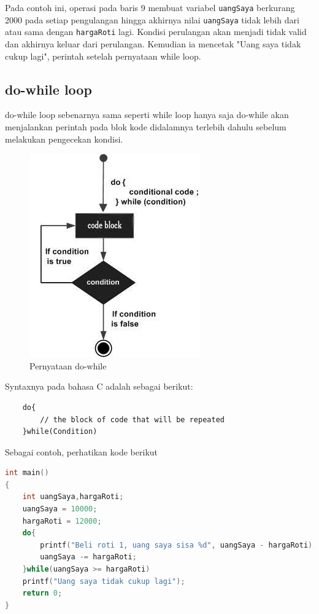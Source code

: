 Pada contoh ini, operasi pada baris 9 membuat variabel \verb|uangSaya| berkurang 2000 pada setiap pengulangan hingga akhirnya nilai \verb|uangSaya| tidak lebih dari atau sama dengan \verb|hargaRoti| lagi.
Kondisi perulangan akan menjadi tidak valid dan akhirnya keluar dari perulangan. Kemudian ia mencetak "Uang saya tidak cukup lagi", perintah setelah pernyataan while loop.
\subsection{do-while loop}
do-while loop sebenarnya sama seperti while loop hanya saja do-while akan menjalankan perintah pada blok kode didalamnya terlebih dahulu sebelum melakukan pengecekan kondisi.
\begin{figure}[H]
	\centering
	\includegraphics[width=0.4\linewidth]{P2/img/dowhileloop.png}
	\caption{Pernyataan do-while}
	\label{fig:dowhileloop}
\end{figure}
Syntaxnya pada bahasa C adalah sebagai berikut:
\begin{verbatim}
    do{
        // the block of code that will be repeated
    }while(Condition)
\end{verbatim}
Sebagai contoh, perhatikan kode berikut
\begin{lstlisting}[language=c,caption = Contoh Penggunaan do-while,label=lst:dowhileexample01]
int main()
{
	int uangSaya,hargaRoti;
	uangSaya = 10000;
	hargaRoti = 12000;
	do{
	    printf("Beli roti 1, uang saya sisa %d", uangSaya - hargaRoti);
	    uangSaya -= hargaRoti;
	}while(uangSaya >= hargaRoti)
	printf("Uang saya tidak cukup lagi");
	return 0;
}
\end{lstlisting}

